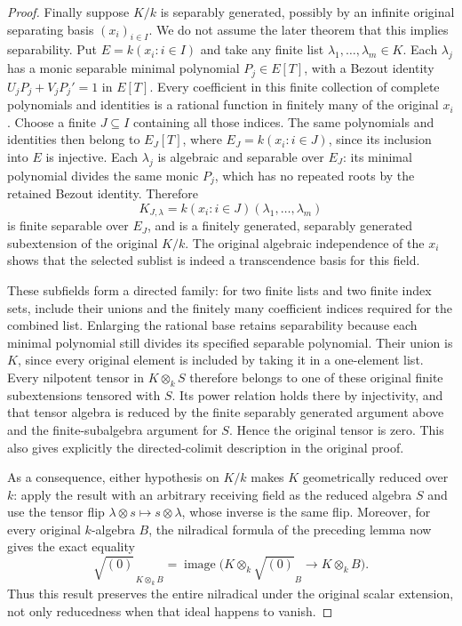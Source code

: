 \begin{proof}
Finally suppose $K/k$ is separably generated,
possibly by an infinite original separating
basis $(x_i)_{i\in I}$. We do not assume
the later theorem that this implies separability.
Put $E=k(x_i:i\in I)$ and take any finite
list $\lambda_1,\ldots,\lambda_m\in K$.
Each $\lambda_j$ has a monic separable
minimal polynomial $P_j\in E[T]$, with a
Bezout identity $U_jP_j+V_jP_j'=1$ in $E[T]$.
Every coefficient in this finite collection
of complete polynomials and identities is
a rational function in finitely many of
the original $x_i$. Choose a finite
$J\subseteq I$ containing all those indices.
The same polynomials and identities then
belong to $E_J[T]$, where
$E_J=k(x_i:i\in J)$, since its inclusion
into $E$ is injective. Each $\lambda_j$
is algebraic and separable over $E_J$:
its minimal polynomial divides the same
monic $P_j$, which has no repeated roots
by the retained Bezout identity.
Therefore
$$
K_{J,\lambda}=k(x_i:i\in J)(\lambda_1,\ldots,\lambda_m)
$$
is finite separable over $E_J$, and is a
finitely generated, separably generated
subextension of the original $K/k$.
The original algebraic independence of the
$x_i$ shows that the selected sublist is
indeed a transcendence basis for this field.

These subfields form a directed family:
for two finite lists and two finite index
sets, include their unions and the finitely
many coefficient indices required for the
combined list. Enlarging the rational base
retains separability because each minimal
polynomial still divides its specified
separable polynomial. Their union is $K$,
since every original element is included
by taking it in a one-element list.
Every nilpotent tensor in $K\otimes_kS$
therefore belongs to one of these original
finite subextensions tensored with $S$.
Its power relation holds there by injectivity,
and that tensor algebra is reduced by the
finite separably generated argument above
and the finite-subalgebra argument for $S$.
Hence the original tensor is zero. This
also gives explicitly the directed-colimit
description in the original proof.

As a consequence, either hypothesis on
$K/k$ makes $K$ geometrically reduced over
$k$: apply the result with an arbitrary
receiving field as the reduced algebra $S$
and use the tensor flip
$\lambda\otimes s\mapsto s\otimes\lambda$,
whose inverse is the same flip. Moreover,
for every original $k$-algebra $B$, the
nilradical formula of the preceding lemma
now gives the exact equality
$$
\sqrt{(0)}_{\,K\otimes_kB}
=\operatorname{image}\bigl(K\otimes_k\sqrt{(0)}_B
\longrightarrow K\otimes_kB\bigr).
$$
Thus this result preserves the entire
nilradical under the original scalar
extension, not only reducedness when
that ideal happens to vanish.
\end{proof}

